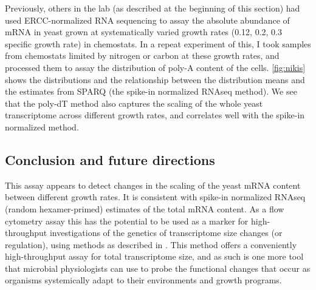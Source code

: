 
Previously, others in the lab (as described at the beginning of this
section) had used ERCC-normalized RNA sequencing
to assay the absolute abundance of mRNA in yeast grown at
systematically varied growth rates (0.12, 0.2, 0.3 specific growth 
rate) in chemostats. In a repeat experiment of this, I took samples 
from chemostats limited by nitrogen or carbon at these growth rates, 
and processed them to assay the distribution of poly-A content of the 
cells. \autoref{fig:nikis} shows the distributions and the
relationship between the distribution means and the estimates from
SPARQ (the spike-in normalized RNAseq method). We see that the poly-dT
method also captures the scaling of the whole yeast transcriptome
across different growth rates, and correlates well with the spike-in
normalized method.


\subsection{Conclusion and future directions}

This assay appears to detect changes in the scaling of the yeast
mRNA content between different growth rates. 
It is consistent with spike-in normalized RNAseq (random 
hexamer-primed) estimates of the total mRNA content.
As a flow cytometry 
assay this has the potential to be used as a marker for
high-throughput investigations of the genetics of transcriptome size
changes (or regulation), using methods as described in
. 
This method offers a conveniently high-throughput assay for total
transcriptome size, and as such is one more tool that microbial
physiologists can use to probe the functional changes that occur as
organisms systemically adapt to their environments and growth
programs.

